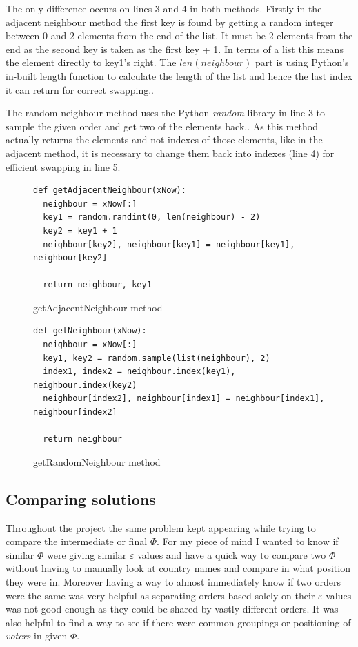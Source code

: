 \documentclass[12pt]{report}
\begin{document}
The only difference occurs on lines 3 and 4 in both methods. Firstly in the adjacent neighbour method the first key is found by getting a random integer between 0 and 2 elements from the end of the list. It must be 2 elements from the end as the second key is taken as the first key + 1. In terms of a list this means the element directly to key1's right. The $len(neighbour)$ part is using Python's in-built length function to calculate the length of the list and hence the last index it can return for correct swapping.\cite{PythonLen}.

The random neighbour method uses the Python \textit{random} library in line 3 to sample the given order and get two of the elements back.\cite{PythonSample}. As this method actually returns the elements and not indexes of those elements, like in the adjacent method, it is necessary to change them back into indexes (line 4) for efficient swapping in line 5.

\begin{figure}[H]
\caption{getAdjacentNeighbour method}
\label{adjacentNeighbour}
\begin{lstlisting}
def getAdjacentNeighbour(xNow):
  neighbour = xNow[:]
  key1 = random.randint(0, len(neighbour) - 2)
  key2 = key1 + 1
  neighbour[key2], neighbour[key1] = neighbour[key1], neighbour[key2]
    
  return neighbour, key1
\end{lstlisting}
\end{figure}

\begin{figure}[H]
\caption{getRandomNeighbour method}
\label{randomNeighbour}
\begin{lstlisting}
def getNeighbour(xNow):
  neighbour = xNow[:]
  key1, key2 = random.sample(list(neighbour), 2)
  index1, index2 = neighbour.index(key1), neighbour.index(key2)
  neighbour[index2], neighbour[index1] = neighbour[index1], neighbour[index2]
    
  return neighbour
\end{lstlisting}
\end{figure}

\subsection{Comparing solutions}\label{Imp-Solutions}
Throughout the project the same problem kept appearing while trying to compare the intermediate or final $\Phi$. For my piece of mind I wanted to know if similar $\Phi$ were giving similar $\varepsilon$ values and have a quick way to compare two $\Phi$ without having to manually look at country names and compare in what position they were in. Moreover having a way to almost immediately know if two orders were the same was very helpful as separating orders based solely on their $\varepsilon$ values was not good enough as they could be shared by vastly different orders. It was also helpful to find a way to see if there were common groupings or positioning of \textit{voters} in given $\Phi$.
\end{document}
